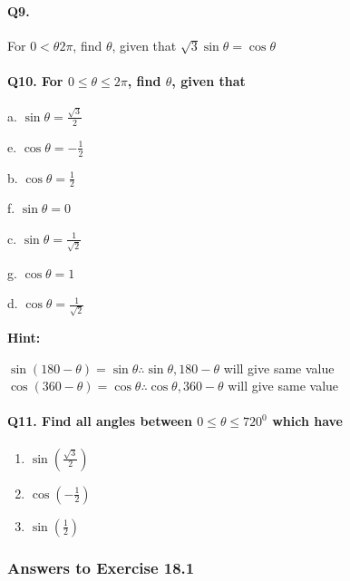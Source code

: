 \documentclass{article}
\begin{document}
\paragraph{Q9.}
For $0<\theta2\pi$, find $\theta$, given that $\sqrt{3}\sin\theta = \cos\theta$

\paragraph {Q10. For $0\leq\theta\leq2\pi$, find $\theta$, given that}
\begin{enumerate}
        \begin{paracol}{3}
          \item[a.] $\sin\theta = \frac{\sqrt{3}}{2}$
          \item[e.] $\cos\theta = -\frac{1}{2}$
          \switchcolumn
          \item[b.] $\cos\theta = \frac{1}{2}$
          \item[f.] $\sin\theta = 0$
          \switchcolumn
          \item[c.] $\sin\theta = \frac{1}{\sqrt{2}}$
          \item[g.] $\cos\theta = 1$
          \switchcolumn
          \item[d.] $\cos\theta = \frac{1}{\sqrt{2}}$
        \end{paracol}
\end{enumerate}

{\scriptsize \textbf{Hint:}}

$\sin(180-\theta) = \sin\theta \therefore \sin\theta, 180-\theta$ will give same value \\

$\cos(360-\theta) = \cos\theta \therefore \cos\theta, 360-\theta$ will give same value

\paragraph{Q11. Find all angles between $0\leq\theta\leq720^{0}$ which have}
\begin{enumerate}[label=\alph*)]
          \item $\sin(\frac{\sqrt{3}}{2})$
          \item $\cos(-\frac{1}{2})$
          \item $\sin(\frac{1}{2})$
\end{enumerate}

\subsubsection {Answers to Exercise 18.1}
\end{document}
